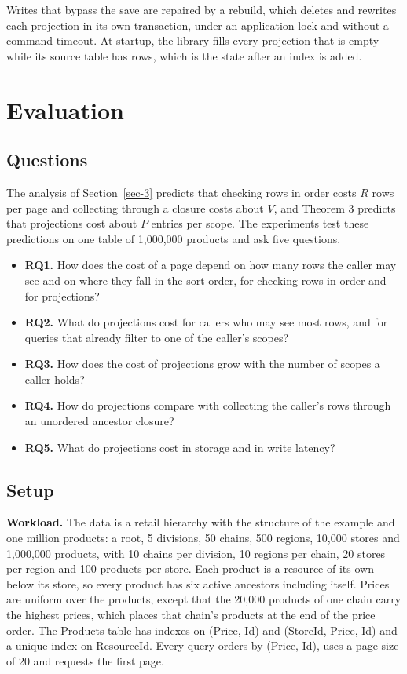\documentclass[conference]{IEEEtran}
\providecommand{\tightlist}{\setlength{\itemsep}{0pt}\setlength{\parskip}{0pt}}
\begin{document}
Writes that bypass the save are repaired by a rebuild, which deletes and rewrites each projection in its own transaction, under an application lock and without a command timeout. At startup, the library fills every projection that is empty while its source table has rows, which is the state after an index is added.

\section{Evaluation}\label{sec-7}

\subsection{Questions}\label{sec-7-1}

The analysis of Section~\ref{sec-3} predicts that checking rows in order costs \(R\) rows per page and collecting through a closure costs about \(V\), and Theorem 3 predicts that projections cost about \(P\) entries per scope. The experiments test these predictions on one table of 1,000,000 products and ask five questions.

\begin{itemize}
\tightlist
\item
  \textbf{RQ1.} How does the cost of a page depend on how many rows the caller may see and on where they fall in the sort order, for checking rows in order and for projections?
\item
  \textbf{RQ2.} What do projections cost for callers who may see most rows, and for queries that already filter to one of the caller's scopes?
\item
  \textbf{RQ3.} How does the cost of projections grow with the number of scopes a caller holds?
\item
  \textbf{RQ4.} How do projections compare with collecting the caller's rows through an unordered ancestor closure?
\item
  \textbf{RQ5.} What do projections cost in storage and in write latency?
\end{itemize}

\subsection{Setup}\label{sec-7-2}

\textbf{Workload.} The data is a retail hierarchy with the structure of the example and one million products: a root, 5 divisions, 50 chains, 500 regions, 10,000 stores and 1,000,000 products, with 10 chains per division, 10 regions per chain, 20 stores per region and 100 products per store. Each product is a resource of its own below its store, so every product has six active ancestors including itself. Prices are uniform over the products, except that the 20,000 products of one chain carry the highest prices, which places that chain's products at the end of the price order. The Products table has indexes on (Price, Id) and (StoreId, Price, Id) and a unique index on ResourceId. Every query orders by (Price, Id), uses a page size of 20 and requests the first page.
\end{document}
